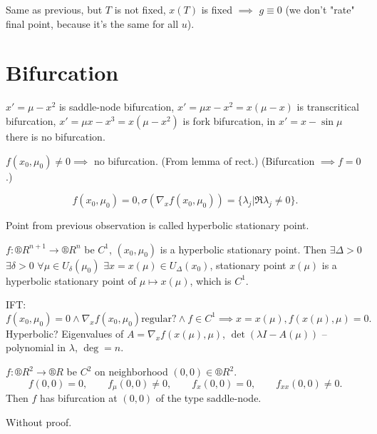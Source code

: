 \documentclass[12pt]{article}					%
\begin{document}
\begin{veta}
	Same as previous, but $T$ is not fixed, $x(T)$ is fixed $\implies$ $g ≡ 0$ (we don't "rate" final point, because it's the same for all $u$).
\end{veta}

\section{Bifurcation}
\begin{definice}
	$x' = \mu - x^2$ is saddle-node bifurcation, $x' = \mu x - x^2 = x(\mu - x)$ is transcritical bifurcation, $x' = \mu x - x^3 = x(\mu - x^2)$ is fork bifurcation, in $x' = x - \sin \mu$ there is no bifurcation.
\end{definice}

\begin{pozorovani}
	$f(x_0, \mu_0) ≠ 0 \implies $ no bifurcation. (From lemma of rect.) (Bifurcation $\implies f = 0$.)
\end{pozorovani}

\begin{pozorovani}
	$$ f(x_0, \mu_0) = 0, \sigma(\nabla_x f(x_0, \mu_0)) = \{\lambda_j | \Re \lambda_j ≠ 0\}. $$
\end{pozorovani}

\begin{definice}
	Point from previous observation is called hyperbolic stationary point.
\end{definice}

\begin{veta}
	$f: ®R^{n+1} \rightarrow ®R^n$ be $C^1$, $(x_0, \mu_0)$ is a hyperbolic stationary point. Then $\exists \Delta > 0$ $\exists \delta > 0$ $\forall \mu \in U_\delta(\mu_0)$ $\exists x = x(\mu) \in U_\Delta(x_0)$, stationary point $x(\mu)$ is a hyperbolic stationary point of $\mu \mapsto x(\mu)$, which is $C^1$.

	\begin{dukazin}
		IFT:
		$$ f(x_0, \mu_0) = 0 \land \nabla_x f(x_0, \mu_0) \text{regular?} \land f \in C^1 \implies x = x(\mu), f(x(\mu), \mu) = 0. $$
		Hyperbolic? Eigenvalues of $A = \nabla_x f(x(\mu), \mu)$, $\det(\lambda I - A(\mu))$ – polynomial in $\lambda$, $\deg = n$.
	\end{dukazin}
\end{veta}

\begin{veta}
	$f: ®R^2 \rightarrow ®R$ be $C^2$ on neighborhood $(0, 0) \in ®R^2$.
	$$ f(0, 0) = 0, \qquad f_\mu(0, 0) ≠ 0, \qquad f_x(0, 0) = 0, \qquad f_{xx}(0, 0) ≠ 0. $$
	Then $f$ has bifurcation at $(0, 0)$ of the type saddle-node.

	\begin{dukazin}
		Without proof.
	\end{dukazin}
\end{veta}
\end{document}
